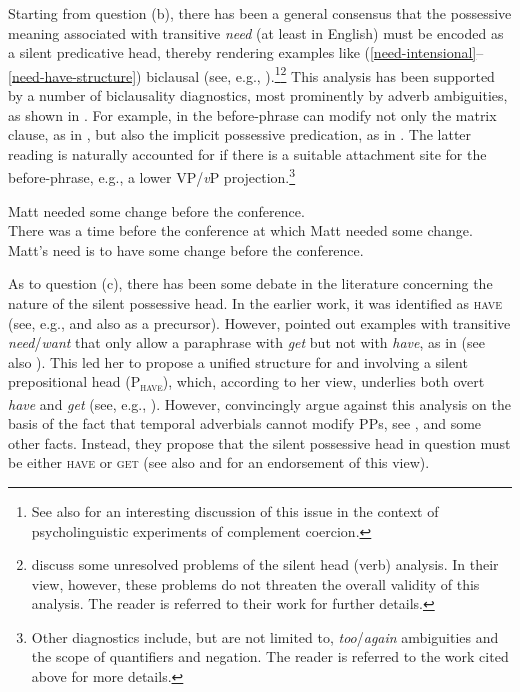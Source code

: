 \documentclass[output=paper]{langscibook}
\begin{document}
Starting from question (b), there has been a general consensus that the possessive meaning associated with transitive \textit{need} (at least in English) must be encoded as a silent predicative head, thereby rendering examples like (\ref{need-intensional}--\ref{need-have-structure}) biclausal (see, e.g., \citealt{denDikken.Larson.Ludlow2018,Schwarz2006,Marusic.Zaucer2006,Harves2008,Zaroukian.Beller2013}).\footnote{See also \citet{Pylkkanen2008} for an interesting discussion of this issue in the context of psycho\-linguistic experiments of complement coercion.}\footnote{\citet{Marusic.Zaucer2006} discuss some unresolved problems of the silent head (verb) analysis. In their view, however, these problems do not threaten the overall validity of this analysis. The reader is referred to their work for further details.} This analysis has been supported by a number of biclausality diagnostics, most prominently by adverb ambiguities, as shown in . For example, in  the before-phrase can modify not only the matrix clause, as in , but also the implicit possessive predication, as in . The latter reading is naturally accounted for if there is a suitable attachment site for the before-phrase, e.g., a lower VP/\textit{v}P projection.\footnote{Other diagnostics include, but are not limited to, \textit{too}/\textit{again} ambiguities and the scope of quantifiers and negation. The reader is referred to the work cited above for more details.}

\ea\label{need-adverb} Matt needed some change before the conference.\\
\ea There was a time before the conference at which Matt needed some change.\label{need-adverb-high}\\
\ex Matt's need is to have some change before the conference.\label{need-adverb-low}\\
\hfill \citep[261]{Schwarz2006}
\z\z

\noindent As to question (c), there has been some debate in the literature concerning the nature of the silent possessive head. In the earlier work, it was identified as \textsc{have} (see, e.g., \citealt{denDikken.Larson.Ludlow2018} and also \citealt{Fodor.Lepore1998} as a precursor). However, \citet{Harley2004} pointed out examples with transitive \textit{need}/\textit{want} that only allow a paraphrase with \textit{get} but not with \textit{have}, as in  (see also \citealt{Harves2008}). This led her to propose a unified structure for  and  involving a silent prepositional head (P\textsubscript{\textsc{have}}), which, according to her view, underlies both overt \textit{have} and \textit{get} (see, e.g., \citealt{Harley2002}). However, \citet{Marusic.Zaucer2006} convincingly argue against this analysis on the basis of the fact that temporal adverbials cannot modify PPs, see , and some other facts. Instead, they propose that the silent possessive head in question must be either \textsc{have} or \textsc{get} (see also \citealt{Harves2008} and \citealt{Zaroukian.Beller2013} for an endorsement of this view).
\end{document}
